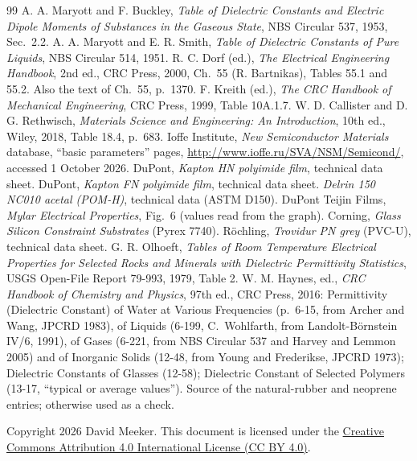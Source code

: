 \documentclass[10pt]{article}
\begin{document}
\begin{thebibliography}{99}
 A. A. Maryott and F. Buckley, \emph{Table of Dielectric Constants and Electric Dipole Moments of Substances in the Gaseous State}, NBS Circular 537, 1953, Sec.~2.2.
 A. A. Maryott and E. R. Smith, \emph{Table of Dielectric Constants of Pure Liquids}, NBS Circular 514, 1951.
 R. C. Dorf (ed.), \emph{The Electrical Engineering Handbook}, 2nd ed., CRC Press, 2000, Ch.~55 (R. Bartnikas), Tables 55.1 and 55.2. Also the text of Ch.~55, p.~1370.
 F. Kreith (ed.), \emph{The CRC Handbook of Mechanical Engineering}, CRC Press, 1999, Table 10A.1.7.
 W. D. Callister and D. G. Rethwisch, \emph{Materials Science and Engineering: An Introduction}, 10th ed., Wiley, 2018, Table 18.4, p.~683.
 Ioffe Institute, \emph{New Semiconductor Materials} database, ``basic parameters'' pages, \url{http://www.ioffe.ru/SVA/NSM/Semicond/}, accessed 1 October 2026.
 DuPont, \emph{Kapton HN polyimide film}, technical data sheet.
 DuPont, \emph{Kapton FN polyimide film}, technical data sheet.
 \emph{Delrin 150 NC010 acetal (POM-H)}, technical data (ASTM D150).
 DuPont Teijin Films, \emph{Mylar Electrical Properties}, Fig.~6 (values read from the graph).
 Corning, \emph{Glass Silicon Constraint Substrates} (Pyrex 7740).
 R\"ochling, \emph{Trovidur PN grey} (PVC-U), technical data sheet.
 G. R. Olhoeft, \emph{Tables of Room Temperature Electrical Properties for Selected Rocks and Minerals with Dielectric Permittivity Statistics}, USGS Open-File Report 79-993, 1979, Table 2.
 W. M. Haynes, ed., \emph{CRC Handbook of Chemistry and Physics}, 97th ed., CRC Press, 2016: Permittivity (Dielectric Constant) of Water at Various Frequencies (p.~6-15, from Archer and Wang, JPCRD 1983), of Liquids (6-199, C.~Wohlfarth, from Landolt-B\"ornstein IV/6, 1991), of Gases (6-221, from NBS Circular 537 and Harvey and Lemmon 2005) and of Inorganic Solids (12-48, from Young and Frederikse, JPCRD 1973); Dielectric Constants of Glasses (12-58); Dielectric Constant of Selected Polymers (13-17, ``typical or average values''). Source of the natural-rubber and neoprene entries; otherwise used as a check.
\end{thebibliography}

\noindent Copyright 2026 David Meeker. This document is licensed under the \href{https://creativecommons.org/licenses/by/4.0/}{Creative Commons Attribution 4.0 International License (CC BY 4.0)}.
\end{document}
